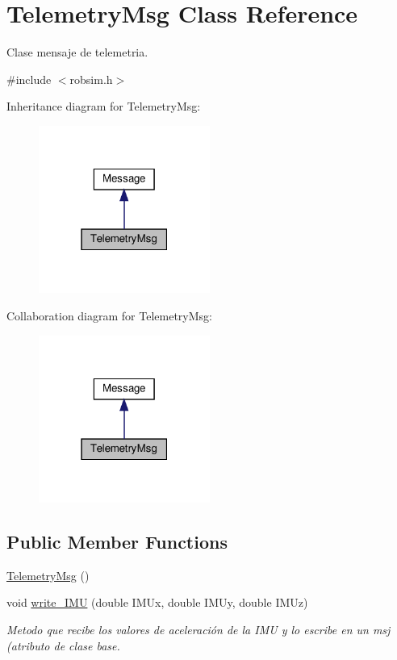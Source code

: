 \hypertarget{classTelemetryMsg}{}\section{Telemetry\+Msg Class Reference}
\label{classTelemetryMsg}


Clase mensaje de telemetria.  




{\ttfamily \#include $<$robsim.\+h$>$}



Inheritance diagram for Telemetry\+Msg\+:\nopagebreak
\begin{figure}[H]
\begin{center}
\leavevmode
\includegraphics[width=159pt]{classTelemetryMsg__inherit__graph}
\end{center}
\end{figure}


Collaboration diagram for Telemetry\+Msg\+:\nopagebreak
\begin{figure}[H]
\begin{center}
\leavevmode
\includegraphics[width=159pt]{classTelemetryMsg__coll__graph}
\end{center}
\end{figure}
\subsection*{Public Member Functions}
\begin{DoxyCompactItemize}
\item 
\hyperlink{classTelemetryMsg_a930ff1a498097417aa25896e5ab92395}{Telemetry\+Msg} ()
\item 
void \hyperlink{classTelemetryMsg_a9c4b738c7a5fdbbaba534160de4f0ef1}{write\+\_\+\+I\+MU} (double I\+M\+Ux, double I\+M\+Uy, double I\+M\+Uz)
\begin{DoxyCompactList}\small\item\em Metodo que recibe los valores de aceleración de la I\+MU y lo escribe en un msj (atributo de clase base. \end{DoxyCompactList}\end{DoxyCompactItemize}
